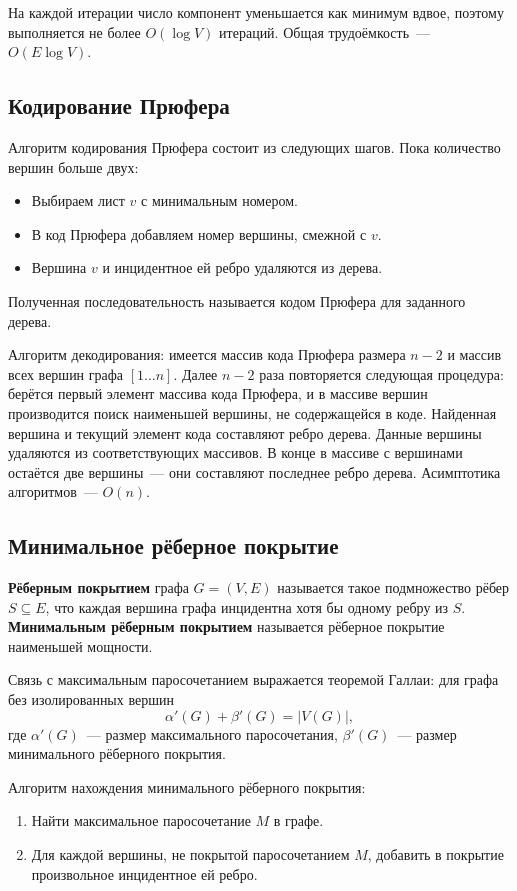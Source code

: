 \documentclass[a4paper,final]{article}
\begin{document}
На каждой итерации число компонент уменьшается как минимум вдвое, поэтому выполняется не более $O(\log V)$ итераций. Общая трудоёмкость~--- $O(E \log V)$.

	\subsection{Кодирование Прюфера}

Алгоритм кодирования Прюфера состоит из следующих шагов. Пока количество вершин больше двух:
\begin{itemize}
  \item Выбираем лист $v$ с минимальным номером.
  \item В код Прюфера добавляем номер вершины, смежной с $v$.
  \item Вершина $v$ и инцидентное ей ребро удаляются из дерева.
\end{itemize}

Полученная последовательность называется кодом Прюфера для заданного дерева.

Алгоритм декодирования: имеется массив кода Прюфера размера $n-2$ и массив всех вершин графа $[1\ldots n]$. Далее $n-2$ раза повторяется следующая процедура: берётся первый элемент массива кода Прюфера, и в массиве вершин производится поиск наименьшей вершины, не содержащейся в коде. Найденная вершина и текущий элемент кода составляют ребро дерева. Данные вершины удаляются из соответствующих массивов. В конце в массиве с вершинами остаётся две вершины~--- они составляют последнее ребро дерева. Асимптотика алгоритмов~--- $O(n)$.

	\subsection{Минимальное рёберное покрытие}

\textbf{Рёберным покрытием} графа $G = (V, E)$ называется такое подмножество рёбер $S \subseteq E$, что каждая вершина графа инцидентна хотя бы одному ребру из $S$. \textbf{Минимальным рёберным покрытием} называется рёберное покрытие наименьшей мощности.

Связь с максимальным паросочетанием выражается теоремой Галлаи: для графа без изолированных вершин
\[
\alpha'(G) + \beta'(G) = |V(G)|,
\]
где $\alpha'(G)$~--- размер максимального паросочетания, $\beta'(G)$~--- размер минимального рёберного покрытия.

Алгоритм нахождения минимального рёберного покрытия:
\begin{enumerate}
  \item Найти максимальное паросочетание $M$ в графе.
  \item Для каждой вершины, не покрытой паросочетанием $M$, добавить в покрытие произвольное инцидентное ей ребро.
\end{enumerate}
\end{document}
